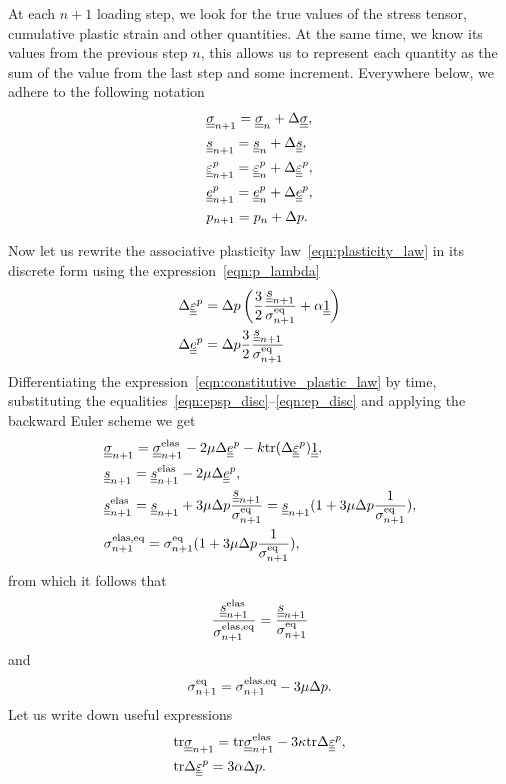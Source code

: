 \documentclass[12pt]{article}
\begin{document}
\begin{appendices}
    At each $n+1$ loading step, we look for the true values of the stress tensor, cumulative plastic strain and other quantities. At the same time, we know its values from the previous step $n$, this allows us to represent each quantity as the sum of the value from the last step and some increment. Everywhere below, we adhere to the following notation
    \begin{align*}
        & \underline{\underline{\sigma}}_{n+1} = \underline{\underline{\sigma}}_n + \Delta\underline{\underline{\sigma}}, \\
        & \underline{\underline{s}}_{n+1} = \underline{\underline{s}}_n + \Delta\underline{\underline{s}}, \\
        & \underline{\underline{\varepsilon}}^p_{n+1} = \underline{\underline{\varepsilon}}^p_{n} + \Delta\underline{\underline{\varepsilon}}^p, \\
        & \underline{\underline{e}}^p_{n+1} = \underline{\underline{e}}^p_{n} + \Delta\underline{\underline{e}}^p, \\
        & p_{n+1} = p_n + \Delta p.
    \end{align*}

    Now let us rewrite the associative plasticity law~\eqref{eqn:plasticity_law} in its discrete form using the expression~\eqref{eqn:p_lambda} 
    \begin{align}
        & \Delta\underline{\underline{\varepsilon}}^p= \Delta p \left( \frac{3}{2} \frac{\underline{\underline{s}}_{n+1}}{\sigma_{n+1}^\text{eq}} + \alpha \underline{\underline{1}} \right) \label{eqn:epsp_disc}\\
        & \Delta\underline{\underline{e}}^p = \Delta p \frac{3}{2} \frac{\underline{\underline{s}}_{n+1}}{\sigma_{n+1}^\text{eq}} \label{eqn:ep_disc}
    \end{align}
    Differentiating the expression~\eqref{eqn:constitutive_plastic_law} by time, substituting the equalities~\eqref{eqn:epsp_disc}--\eqref{eqn:ep_disc} and applying the backward Euler scheme we get 
    \begin{align}
        & \underline{\underline{\sigma}}_{n+1} = \underline{\underline{\sigma}}_{n+1}^\text{elas} - 2\mu \Delta\underline{\underline{e}}^p - k \mathrm{tr} (\Delta\underline{\underline{\varepsilon}}^p) \underline{\underline{1}}, \label{eqn:sigma_disc}\\
        & \underline{\underline{s}}_{n+1} = \underline{\underline{s}}_{n+1}^\text{elas} - 2\mu\Delta\underline{\underline{e}}^p, \\
        & \underline{\underline{s}}_{n+1}^\text{elas} = \underline{\underline{s}}_{n+1} + 3\mu\Delta p \frac{\underline{\underline{s}}_{n+1}}{\sigma_{n+1}^\text{eq}} = \underline{\underline{s}}_{n+1} (1 +  3\mu\Delta p \frac{1}{\sigma_{n+1}^\text{eq}}), \\
        & \sigma_{n+1}^\text{elas,eq} = \sigma_{n+1}^\text{eq} (1 +  3\mu\Delta p \frac{1}{\sigma_{n+1}^\text{eq}}),
    \end{align}
    from which it follows that
    \begin{equation}
        \frac{\underline{\underline{s}}_{n+1}^\text{elas}}{\sigma_{n+1}^\text{elas,eq}} = \frac{\underline{\underline{s}}_{n+1}}{\sigma_{n+1}^\text{eq}}
    \end{equation}
    and 
    \begin{equation}\label{eqn:sigmaeqn_disc}
        \sigma_{n+1}^\text{eq} = \sigma_{n+1}^\text{elas,eq} - 3\mu\Delta p.
    \end{equation} 
    Let us write down useful expressions   
    \begin{align}
        & \mathrm{tr} \underline{\underline{\sigma}}_{n+1} = \mathrm{tr} \underline{\underline{\sigma}}_{n+1}^{\text{elas}} - 3\kappa \mathrm{tr} \Delta\underline{\underline{\varepsilon}}^p, \label{eqn:tr_sigman}\\
        & \mathrm{tr} \Delta\underline{\underline{\varepsilon}}^p= 3\alpha \Delta p. \label{eqn:tr_delta_eps_p}
    \end{align}


\end{appendices}
\end{document}
